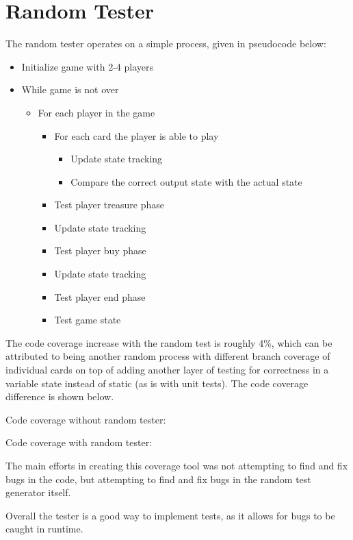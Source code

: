 \documentclass[letterpaper,10pt,onecolumn,draftclsnofoot]{IEEEtran}
\begin{document}
\section{Random Tester}
The random tester operates on a simple process, given in pseudocode below:

\begin{itemize}
\item Initialize game with 2-4 players
\item While game is not over
\begin{itemize}
	\item For each player in the game
	\begin{itemize}
		\item For each card the player is able to play
		\begin{itemize}
			\item Update state tracking
			\item Compare the correct output state with the actual state
		\end{itemize}
		\item Test player treasure phase
		\item Update state tracking
		\item Test player buy phase
		\item Update state tracking
		\item Test player end phase
		\item Test game state
	\end{itemize}
\end{itemize}
\end{itemize}

The code coverage increase with the random test is roughly 4\%, which can be attributed to being another random process with different branch coverage of individual cards on top of adding another layer of testing for correctness in a variable state instead of static (as is with unit tests). The code coverage difference is shown below.

Code coverage without random tester:


Code coverage with random tester:


The main efforts in creating this coverage tool was not attempting to find and fix bugs in the code, but attempting to find and fix bugs in the random test generator itself.

Overall the tester is a good way to implement tests, as it allows for bugs to be caught in runtime.
\end{document}
